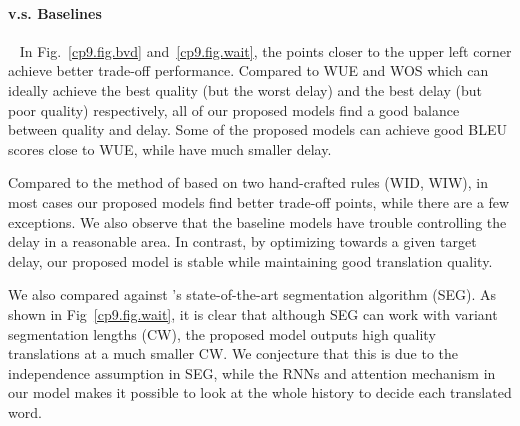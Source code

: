 \paragraph{v.s. Baselines}~
In Fig.~\ref{cp9.fig.bvd} and~\ref{cp9.fig.wait}, %
the points closer to the upper left corner achieve better trade-off performance. 
Compared to WUE and WOS which can ideally achieve the best quality (but the worst delay) and the best delay (but poor quality) respectively, all of our proposed models find a good balance between quality and delay.  Some of the proposed models can achieve good BLEU scores close to WUE, while have much smaller delay.


Compared to the method of \citep{cho2016can} based on two hand-crafted rules (WID, WIW), in most cases our proposed models find better trade-off points, while there are a few exceptions. We also observe that the baseline models have trouble controlling the delay in a reasonable area. In contrast, by optimizing towards a given target delay, our proposed model is stable while maintaining good translation quality.
  
We also compared against \citep{oda-EtAl:2014:P14-2}'s state-of-the-art segmentation algorithm (SEG). As shown in Fig~\ref{cp9.fig.wait}, it is clear that although SEG can work with variant segmentation lengths (CW), 
the proposed model outputs high quality translations at a much smaller CW. 
We conjecture that this is due to the independence assumption in SEG,
while the RNNs and attention mechanism in our model makes it possible to look at the whole history to decide each translated word.

